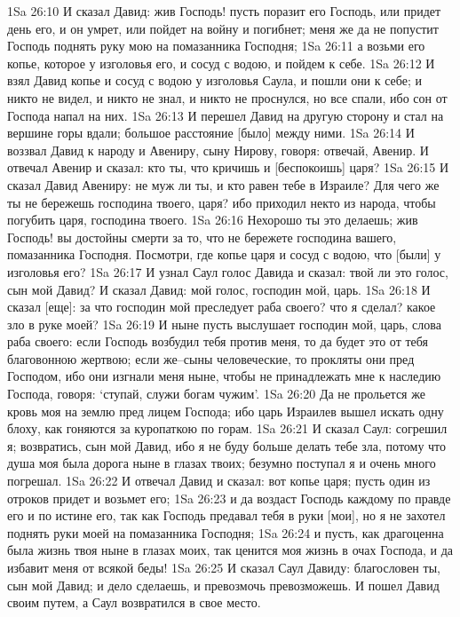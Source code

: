 1Sa 26:10  И сказал Давид: жив Господь! пусть поразит его Господь, или придет день его, и он умрет, или пойдет на войну и погибнет; меня же да не попустит Господь поднять руку мою на помазанника Господня;
1Sa 26:11  а возьми его копье, которое у изголовья его, и сосуд с водою, и пойдем к себе.
1Sa 26:12  И взял Давид копье и сосуд с водою у изголовья Саула, и пошли они к себе; и никто не видел, и никто не знал, и никто не проснулся, но все спали, ибо сон от Господа напал на них.
1Sa 26:13  И перешел Давид на другую сторону и стал на вершине горы вдали; большое расстояние [было] между ними.
1Sa 26:14  И воззвал Давид к народу и Авениру, сыну Нирову, говоря: отвечай, Авенир. И отвечал Авенир и сказал: кто ты, что кричишь и [беспокоишь] царя?
1Sa 26:15  И сказал Давид Авениру: не муж ли ты, и кто равен тебе в Израиле? Для чего же ты не бережешь господина твоего, царя? ибо приходил некто из народа, чтобы погубить царя, господина твоего.
1Sa 26:16  Нехорошо ты это делаешь; жив Господь! вы достойны смерти за то, что не бережете господина вашего, помазанника Господня. Посмотри, где копье царя и сосуд с водою, что [были] у изголовья его?
1Sa 26:17  И узнал Саул голос Давида и сказал: твой ли это голос, сын мой Давид? И сказал Давид: мой голос, господин мой, царь.
1Sa 26:18  И сказал [еще]: за что господин мой преследует раба своего? что я сделал? какое зло в руке моей?
1Sa 26:19  И ныне пусть выслушает господин мой, царь, слова раба своего: если Господь возбудил тебя против меня, то да будет это от тебя благовонною жертвою; если же--сыны человеческие, то прокляты они пред Господом, ибо они изгнали меня ныне, чтобы не принадлежать мне к наследию Господа, говоря: `ступай, служи богам чужим'.
1Sa 26:20  Да не прольется же кровь моя на землю пред лицем Господа; ибо царь Израилев вышел искать одну блоху, как гоняются за куропаткою по горам.
1Sa 26:21  И сказал Саул: согрешил я; возвратись, сын мой Давид, ибо я не буду больше делать тебе зла, потому что душа моя была дорога ныне в глазах твоих; безумно поступал я и очень много погрешал.
1Sa 26:22  И отвечал Давид и сказал: вот копье царя; пусть один из отроков придет и возьмет его;
1Sa 26:23  и да воздаст Господь каждому по правде его и по истине его, так как Господь предавал тебя в руки [мои], но я не захотел поднять руки моей на помазанника Господня;
1Sa 26:24  и пусть, как драгоценна была жизнь твоя ныне в глазах моих, так ценится моя жизнь в очах Господа, и да избавит меня от всякой беды!
1Sa 26:25  И сказал Саул Давиду: благословен ты, сын мой Давид; и дело сделаешь, и превозмочь превозможешь. И пошел Давид своим путем, а Саул возвратился в свое место.
